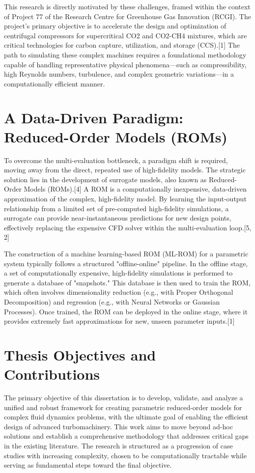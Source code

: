 \documentclass[12pt, a4paper]{report}
\begin{document}
This research is directly motivated by these challenges, framed within the context of Project 77 of the Research Centre for Greenhouse Gas Innovation (RCGI). The project's primary objective is to accelerate the design and optimization of centrifugal compressors for supercritical CO2 and CO2-CH4 mixtures, which are critical technologies for carbon capture, utilization, and storage (CCS).[1] The path to simulating these complex machines requires a foundational methodology capable of handling representative physical phenomena—such as compressibility, high Reynolds numbers, turbulence, and complex geometric variations—in a computationally efficient manner.

\section{A Data-Driven Paradigm: Reduced-Order Models (ROMs)}

To overcome the multi-evaluation bottleneck, a paradigm shift is required, moving away from the direct, repeated use of high-fidelity models. The strategic solution lies in the development of surrogate models, also known as Reduced-Order Models (ROMs).[4] A ROM is a computationally inexpensive, data-driven approximation of the complex, high-fidelity model. By learning the input-output relationship from a limited set of pre-computed high-fidelity simulations, a surrogate can provide near-instantaneous predictions for new design points, effectively replacing the expensive CFD solver within the multi-evaluation loop.[5, 2]

The construction of a machine learning-based ROM (ML-ROM) for a parametric system typically follows a structured "offline-online" pipeline. In the offline stage, a set of computationally expensive, high-fidelity simulations is performed to generate a database of "snapshots." This database is then used to train the ROM, which often involves dimensionality reduction (e.g., with Proper Orthogonal Decomposition) and regression (e.g., with Neural Networks or Gaussian Processes). Once trained, the ROM can be deployed in the online stage, where it provides extremely fast approximations for new, unseen parameter inputs.[1]

\section{Thesis Objectives and Contributions}

The primary objective of this dissertation is to develop, validate, and analyze a unified and robust framework for creating parametric reduced-order models for complex fluid dynamics problems, with the ultimate goal of enabling the efficient design of advanced turbomachinery. This work aims to move beyond ad-hoc solutions and establish a comprehensive methodology that addresses critical gaps in the existing literature. The research is structured as a progression of case studies with increasing complexity, chosen to be computationally tractable while serving as fundamental steps toward the final objective.
\end{document}
